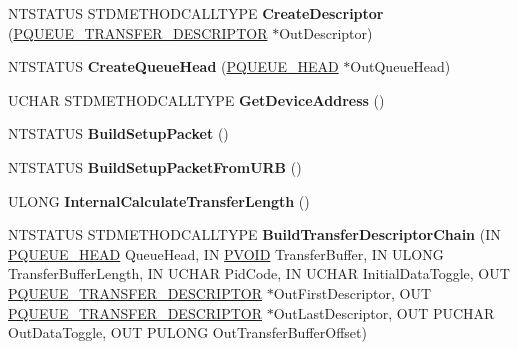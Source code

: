 \begin{DoxyCompactItemize}
N\+T\+S\+T\+A\+T\+US S\+T\+D\+M\+E\+T\+H\+O\+D\+C\+A\+L\+L\+T\+Y\+PE {\bfseries Create\+Descriptor} (\hyperlink{struct___q_u_e_u_e___t_r_a_n_s_f_e_r___d_e_s_c_r_i_p_t_o_r}{P\+Q\+U\+E\+U\+E\+\_\+\+T\+R\+A\+N\+S\+F\+E\+R\+\_\+\+D\+E\+S\+C\+R\+I\+P\+T\+OR} $\ast$Out\+Descriptor)
\item 
\mbox{\label{class_c_u_s_b_request_a7ca2725686e49c5523b6633d17f1e4f2}} 
N\+T\+S\+T\+A\+T\+US {\bfseries Create\+Queue\+Head} (\hyperlink{struct___q_u_e_u_e___h_e_a_d}{P\+Q\+U\+E\+U\+E\+\_\+\+H\+E\+AD} $\ast$Out\+Queue\+Head)
\item 
\mbox{\label{class_c_u_s_b_request_a4efd7319fed4233a64a3b07bab79f8eb}} 
U\+C\+H\+AR S\+T\+D\+M\+E\+T\+H\+O\+D\+C\+A\+L\+L\+T\+Y\+PE {\bfseries Get\+Device\+Address} ()
\item 
\mbox{\label{class_c_u_s_b_request_a3b5a481af7c99db9a583bd1442a338f7}} 
N\+T\+S\+T\+A\+T\+US {\bfseries Build\+Setup\+Packet} ()
\item 
\mbox{\label{class_c_u_s_b_request_a368b9e19db90a8cbcc7308c47b559034}} 
N\+T\+S\+T\+A\+T\+US {\bfseries Build\+Setup\+Packet\+From\+U\+RB} ()
\item 
\mbox{\label{class_c_u_s_b_request_a71dc372bc086b3bc5ba0b21dad5953af}} 
U\+L\+O\+NG {\bfseries Internal\+Calculate\+Transfer\+Length} ()
\item 
\mbox{\label{class_c_u_s_b_request_a9358cbe666b14705d0ee3f808a36e034}} 
N\+T\+S\+T\+A\+T\+US S\+T\+D\+M\+E\+T\+H\+O\+D\+C\+A\+L\+L\+T\+Y\+PE {\bfseries Build\+Transfer\+Descriptor\+Chain} (IN \hyperlink{struct___q_u_e_u_e___h_e_a_d}{P\+Q\+U\+E\+U\+E\+\_\+\+H\+E\+AD} Queue\+Head, IN \hyperlink{interfacevoid}{P\+V\+O\+ID} Transfer\+Buffer, IN U\+L\+O\+NG Transfer\+Buffer\+Length, IN U\+C\+H\+AR Pid\+Code, IN U\+C\+H\+AR Initial\+Data\+Toggle, O\+UT \hyperlink{struct___q_u_e_u_e___t_r_a_n_s_f_e_r___d_e_s_c_r_i_p_t_o_r}{P\+Q\+U\+E\+U\+E\+\_\+\+T\+R\+A\+N\+S\+F\+E\+R\+\_\+\+D\+E\+S\+C\+R\+I\+P\+T\+OR} $\ast$Out\+First\+Descriptor, O\+UT \hyperlink{struct___q_u_e_u_e___t_r_a_n_s_f_e_r___d_e_s_c_r_i_p_t_o_r}{P\+Q\+U\+E\+U\+E\+\_\+\+T\+R\+A\+N\+S\+F\+E\+R\+\_\+\+D\+E\+S\+C\+R\+I\+P\+T\+OR} $\ast$Out\+Last\+Descriptor, O\+UT P\+U\+C\+H\+AR Out\+Data\+Toggle, O\+UT P\+U\+L\+O\+NG Out\+Transfer\+Buffer\+Offset)

\end{DoxyCompactItemize}
